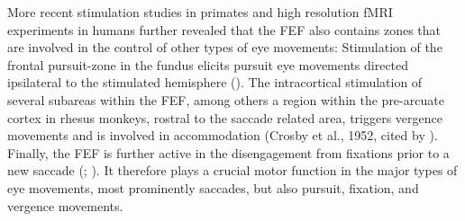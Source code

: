 \documentclass[a4paper, 12pt]{scrreprt}
\begin{document}
More recent stimulation studies in primates and high resolution fMRI experiments in humans further revealed that the FEF also contains zones that are involved in the control of other types of eye movements: Stimulation of the frontal pursuit-zone in the fundus elicits pursuit eye movements directed ipsilateral to the stimulated hemisphere (\cite{blanke2003direction}). The intracortical stimulation of several subareas within the FEF, among others a region within the pre-arcuate cortex in rhesus monkeys, rostral to the saccade related area, triggers vergence movements and is involved in accommodation (Crosby et al., 1952, cited by \textcite{vernet2014corrigendum}). Finally, the FEF is further active in the disengagement from fixations prior to a new saccade (\cite{goodwin2007cranial}; \cite{tehovnik2000eye}). It therefore plays a crucial motor function in the major types of eye movements, most prominently saccades, but also pursuit, fixation, and vergence movements. \newline
\end{document}
